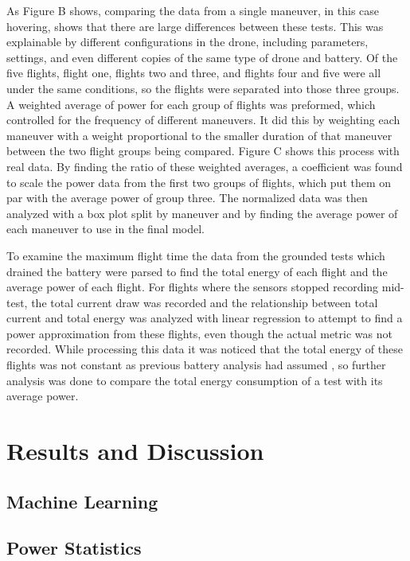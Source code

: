 \documentclass{article}
\begin{document}
As Figure B shows, comparing the data from a single maneuver, in this case hovering, shows that there are large differences between these tests. This was explainable by different configurations in the drone, including parameters, settings, and even different copies of the same type of drone and battery. Of the five flights, flight one, flights two and three, and flights four and five were all under the same conditions, so the flights were separated into those three groups. A weighted average of power for each group of flights was preformed, which controlled for the frequency of different maneuvers. It did this by weighting each maneuver with a weight proportional to the smaller duration of that maneuver between the two flight groups being compared. Figure C shows this process with real data. By finding the ratio of these weighted averages, a coefficient was found to scale the power data from the first two groups of flights, which put them on par with the average power of group three. The normalized data was then analyzed with a box plot split by maneuver and by finding the average power of each maneuver to use in the final model.\par

To examine the maximum flight time the data from the grounded tests which drained the battery were parsed to find the total energy of each flight and the average power of each flight. For flights where the  sensors stopped recording mid-test, the total current draw was recorded and the relationship between total current and total energy was analyzed with linear regression to attempt to find a power approximation from these flights, even though the actual metric was not recorded. While processing this data it was noticed that the total energy of these flights was not constant as previous battery analysis had assumed \cite{Prasetia}, so further analysis was done to compare the total energy consumption of a test with its average power.



\section{Results and Discussion}

\subsection{Machine Learning}
\subsection{Power Statistics}
\end{document}
